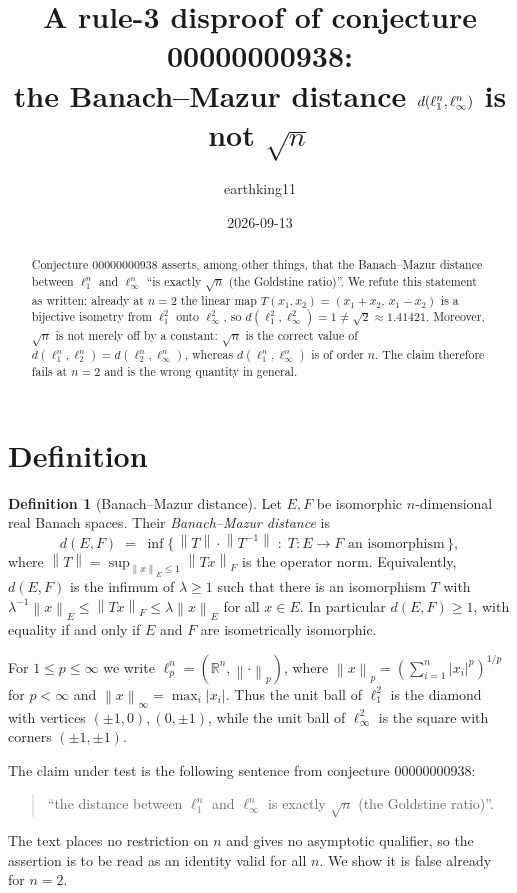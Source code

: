\documentclass[11pt]{article}
\title{A rule-3 disproof of conjecture 00000000938:\\
the Banach--Mazur distance $d(\lone^n,\linf^n)$ is not $\sqrt n$}
\author{earthking11}
\date{2026-09-13}
\theoremstyle{definition}
\newtheorem{definition}[theorem]{Definition}
\theoremstyle{remark}
\newcommand{\R}{\mathbb{R}}
\newcommand{\norm}[1]{\left\lVert #1 \right\rVert}
\newcommand{\linf}{\ell_\infty}
\newcommand{\lone}{\ell_1}
\newcommand{\ltwo}{\ell_2}
\begin{document}
\maketitle

\begin{abstract}
Conjecture 00000000938 asserts, among other things, that the Banach--Mazur
distance between $\lone^n$ and $\linf^n$ ``is exactly $\sqrt n$ (the Goldstine
ratio)''. We refute this statement as written: already at $n=2$ the linear map
$T(x_1,x_2)=(x_1+x_2,\,x_1-x_2)$ is a bijective isometry from $\lone^2$ onto
$\linf^2$, so $d(\lone^2,\linf^2)=1\neq\sqrt2\approx1.41421$. Moreover,
$\sqrt n$ is not merely off by a constant: $\sqrt n$ is the correct value of
$d(\lone^n,\ltwo^n)=d(\ltwo^n,\linf^n)$, whereas $d(\lone^n,\linf^n)$ is of
order $n$. The claim therefore fails at $n=2$ and is the wrong quantity in
general.
\end{abstract}

\section{Definition}

\begin{definition}[Banach--Mazur distance]
Let $E,F$ be isomorphic $n$-dimensional real Banach spaces. Their
\emph{Banach--Mazur distance} is
\[
  d(E,F) \;=\; \inf\{\,\norm{T}\cdot\norm{T^{-1}} \;:\; T:E\to F
  \text{ an isomorphism}\,\},
\]
where $\norm{T}=\sup_{\norm{x}_E\le 1}\norm{Tx}_F$ is the operator norm.
Equivalently, $d(E,F)$ is the infimum of $\lambda\ge1$ such that there is an
isomorphism $T$ with $\lambda^{-1}\norm{x}_E\le\norm{Tx}_F\le\lambda\norm{x}_E$
for all $x\in E$. In particular $d(E,F)\ge1$, with equality if and only if
$E$ and $F$ are isometrically isomorphic.
\end{definition}

For $1\le p\le\infty$ we write $\ell_p^n=(\R^n,\norm{\cdot}_p)$, where
$\norm{x}_p=(\sum_{i=1}^n|x_i|^p)^{1/p}$ for $p<\infty$ and
$\norm{x}_\infty=\max_i|x_i|$. Thus the unit ball of $\lone^2$ is the diamond
with vertices $(\pm1,0),(0,\pm1)$, while the unit ball of $\linf^2$ is the
square with corners $(\pm1,\pm1)$.

The claim under test is the following sentence from conjecture 00000000938:
\begin{quote}
``the distance between $\lone^n$ and $\linf^n$ is exactly $\sqrt n$ (the
Goldstine ratio)''.
\end{quote}
The text places no restriction on $n$ and gives no asymptotic qualifier, so the
assertion is to be read as an identity valid for all $n$. We show it is false
already for $n=2$.
\end{document}
